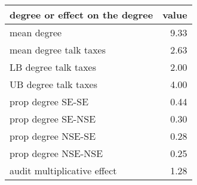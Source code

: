 \begin{table}[ht]
\centering
\begin{tabular}{lr}
  \hline
degree or effect on the degree & value \\ 
  \hline
mean degree & 9.33 \\ 
  mean degree talk taxes & 2.63 \\ 
  LB degree talk taxes & 2.00 \\ 
  UB degree talk taxes & 4.00 \\ 
  prop degree SE-SE & 0.44 \\ 
  prop degree SE-NSE & 0.30 \\ 
  prop degree NSE-SE & 0.28 \\ 
  prop degree NSE-NSE & 0.25 \\ 
  audit multiplicative effect & 1.28 \\ 
   \hline
\end{tabular}
\end{table}
